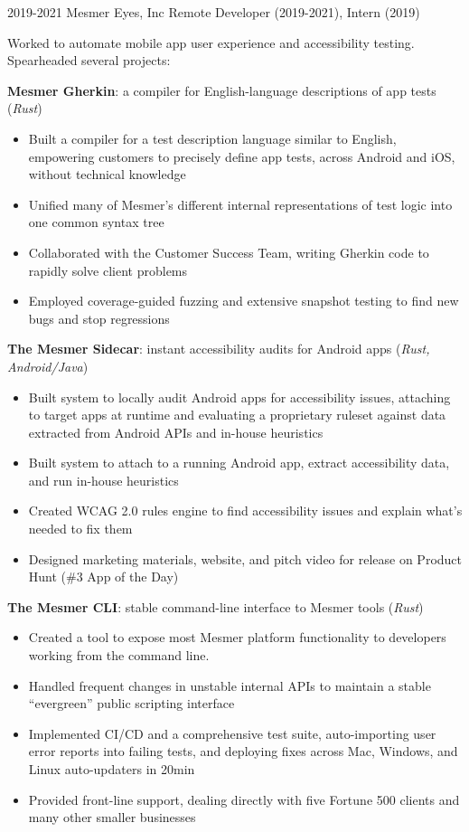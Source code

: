 \documentclass[letterpaper,10pt]{article}
\begin{document}
\work
{2019-2021}
{Mesmer Eyes, Inc}
{Remote}
{Developer (2019-2021), Intern (2019)}
{
	Worked to automate mobile app user experience and accessibility testing. Spearheaded several projects:

	\vbeat
	\textbf{Mesmer Gherkin}:
	a compiler for English-language descriptions of app tests
	(\textit{Rust})

	\begin{itemize}
	\item Built a compiler for a test description language similar to English, empowering customers to precisely define app tests, across Android and iOS, without technical knowledge
	\item Unified many of Mesmer's different internal representations of test logic into one common syntax tree
	\item Collaborated with the Customer Success Team, writing Gherkin code to rapidly solve client problems
	\item Employed coverage-guided fuzzing and extensive snapshot testing to find new bugs and stop regressions
	\end{itemize}

    \vbeat
	\textbf{The Mesmer Sidecar}:
	instant accessibility audits for Android apps
	(\textit{Rust, Android/Java})

	\begin{itemize}
	\item Built system to locally audit Android apps for accessibility issues, attaching to target apps at runtime and evaluating a proprietary ruleset against data extracted from Android APIs and in-house heuristics
	\item Built system to attach to a running Android app, extract accessibility data, and run in-house heuristics
	\item Created WCAG 2.0 rules engine to find accessibility issues and explain what's needed to fix them
	\item Designed marketing materials, website, and pitch video for release on Product Hunt (\#3 App of the Day)
	\end{itemize}

    \vbeat
	\textbf{The Mesmer CLI}: 
	stable command-line interface to Mesmer tools
	(\textit{Rust})

	\begin{itemize}
	\item Created a tool to expose most Mesmer platform functionality to developers working from the command line.
	\item Handled frequent changes in unstable internal APIs to maintain a stable ``evergreen'' public scripting interface
	\item Implemented CI/CD and a comprehensive test suite, auto-importing user error reports into failing tests, and deploying fixes across Mac, Windows, and Linux auto-updaters in 20min
	\item Provided front-line support, dealing directly with five Fortune 500 clients and many other smaller businesses
	\end{itemize}
}
\end{document}
